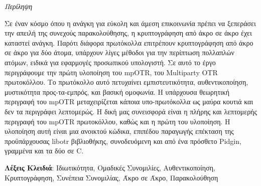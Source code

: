 \documentclass[
11pt, %
english, %
singlespacing, %
parskip, %
headsepline, %
]{MastersDoctoralThesis} %
\begin{document}





\thispagestyle{plain}
\begin{center}
  {\huge\textit{Περίληψη} \par}
  \bigskip
\end{center}

Σε έναν κόσμο όπου η ανάγκη για εύκολη και άμεση επικοινωνία πρέπει να ξεπεράσει την απειλή της συνεχούς παρακολούθησης, η κρυπτογράφηση από άκρο σε άκρο έχει καταστεί ανάγκη.
Παρότι διάφορα πρωτόκολλα επιτρέπουν κρυπτογράφηση από άκρο σε άκρο για δύο άτομα, υπάρχουν λίγες μέθοδοι για την περίπτωση πολλαπλών ατόμων, ειδικά για εφαρμογές προσωπικού υπολογιστή.
Σε αυτό το έργο περιγράφουμε την πρώτη υλοποίηση του mpOTR, του Multiparty OTR πρωτοκόλλου.
Το πρωτόκολλο αυτό πετυχαίνει εμπιστευτικότητα, αυθεντικοποίηση, μυστικότητα προς-τα-εμπρός, και βασική ομοφωνία.
Η υπάρχουσα θεωρητική περιγραφή του mpOTR μεταχειρίζεται κάποια υπο-πρωτόκολλα ως μαύρα κουτιά και δεν τα περιγράφει λεπτομερώς.
Η δική μας συνεισφορά είναι η πλήρης και λεπτομερής περιγραφή του mpOTR πρωτοκόλλου, καθώς και η πρώτη του υλοποίηση.
Η υλοποίηση αυτή είναι μια ανοικτού κώδικα, επιπέδου παραγωγής επέκταση της προϋπάρχουσας libotr βιβλιοθήκης, συνοδευόμενη και από ένα πρόσθετο Pidgin, γραμμένα και τα δύο σε C.

  \vspace*{\fill}

  {\bf Λέξεις Κλειδιά}: Ιδιωτικότητα, Ομαδικές Συνομιλίες, Αυθεντικοποίηση, Κρυπτογράφηση, Συνέπεια Συνομιλίας, Άκρο σε Άκρο, Παρακολούθηση

\pagebreak

\end{document}
